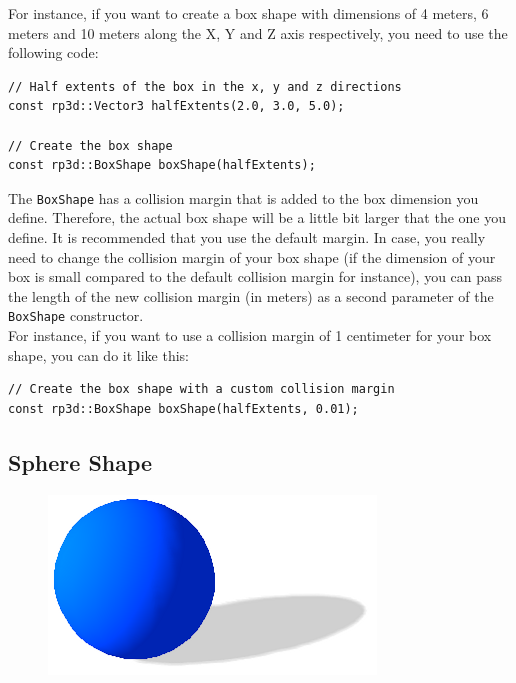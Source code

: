 \documentclass[a4paper,12pt]{article}
\begin{document}
    For instance, if you want to create a box shape with dimensions of 4 meters, 6 meters and 10 meters along the X, Y and Z axis respectively, you need to use the
    following code: \\

    \begin{lstlisting}
// Half extents of the box in the x, y and z directions
const rp3d::Vector3 halfExtents(2.0, 3.0, 5.0);

// Create the box shape
const rp3d::BoxShape boxShape(halfExtents);
  \end{lstlisting}

    \vspace{0.6cm}

    The \texttt{BoxShape} has a collision margin that is added to the box dimension you define. Therefore, the actual box shape will be a little bit larger that the one you define.
    It is recommended that you use the default margin. In case, you really need to change the collision margin of your box shape (if the dimension of your box is small compared
    to the default collision margin for instance), you can pass the length of the new collision margin (in meters) as a second parameter of the \texttt{BoxShape} constructor. \\

    For instance, if you want to use a collision margin of 1 centimeter for your box shape, you can do it like this: \\

   \begin{lstlisting}
// Create the box shape with a custom collision margin
const rp3d::BoxShape boxShape(halfExtents, 0.01);
  \end{lstlisting}

    \subsection{Sphere Shape}

    \begin{figure}[h]
        \centering
        \includegraphics{sphereshape.png}
        \label{fig:sphereshape}
    \end{figure}
\end{document}
